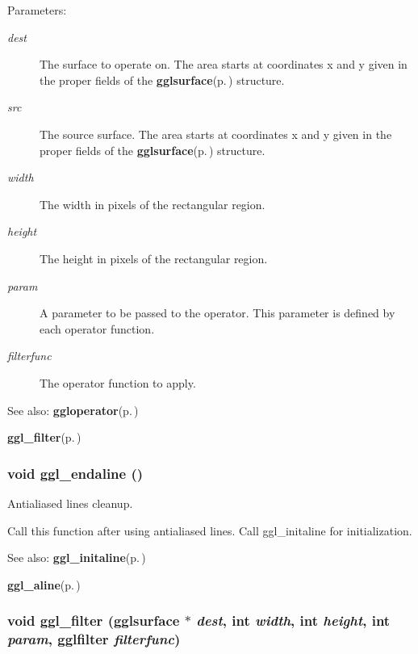 \begin{Desc}
\item[Parameters:]
\begin{description}
\item[{\em dest}]The surface to operate on. The area starts at coordinates x and y given in the proper fields of the {\bf gglsurface}{\rm (p.\,\pageref{structgglsurface})} structure. \item[{\em src}]The source surface. The area starts at coordinates x and y given in the proper fields of the {\bf gglsurface}{\rm (p.\,\pageref{structgglsurface})} structure. \item[{\em width}]The width in pixels of the rectangular region. \item[{\em height}]The height in pixels of the rectangular region. \item[{\em param}]A parameter to be passed to the operator. This parameter is defined by each operator function. \item[{\em filterfunc}]The operator function to apply.\end{description}
\end{Desc}
\begin{Desc}
\item[See also:]{\bf ggloperator}{\rm (p.\,\pageref{ggl_8h_a8})} 

{\bf ggl\_\-filter}{\rm (p.\,\pageref{ggl_8h_a26})} \end{Desc}
\subsubsection{\setlength{\rightskip}{0pt plus 5cm}void ggl\_\-endaline ()}\label{ggl_8h_a36}


Antialiased lines cleanup. 

Call this function after using antialiased lines. Call ggl\_\-initaline for initialization.

\begin{Desc}
\item[See also:]{\bf ggl\_\-initaline}{\rm (p.\,\pageref{ggl_8h_a34})} 

{\bf ggl\_\-aline}{\rm (p.\,\pageref{ggl_8h_a35})} \end{Desc}
\subsubsection{\setlength{\rightskip}{0pt plus 5cm}void ggl\_\-filter ({\bf gglsurface} $\ast$ {\em dest}, int {\em width}, int {\em height}, int {\em param}, {\bf gglfilter} {\em filterfunc})}\label{ggl_8h_a26}


